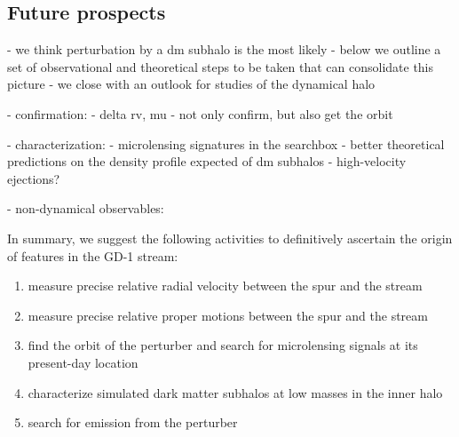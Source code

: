 \documentclass[twocolumn]{aastex62}
\newcommand{\acronym}[1]{{\small{#1}}}
\newcommand{\lcdm}{\acronym{$\Lambda$CDM}}
\begin{document}



\subsection{Future prospects}
\label{sec:future}
- we think perturbation by a dm subhalo is the most likely
- below we outline a set of observational and theoretical steps to be taken that can consolidate this picture
- we close with an outlook for studies of the dynamical halo

- confirmation:
- delta rv, mu
- not only confirm, but also get the orbit

- characterization:
- microlensing signatures in the searchbox
- better theoretical predictions on the density profile expected of dm subhalos
- high-velocity ejections?

- non-dynamical observables:

In summary, we suggest the following activities to definitively ascertain the origin of features in the GD-1 stream:
\begin{enumerate}
 \item measure precise relative radial velocity between the spur and the stream
 \item measure precise relative proper motions between the spur and the stream
 \item find the orbit of the perturber and search for microlensing signals at its present-day location
 \item characterize simulated dark matter subhalos at low masses in the inner halo
 \item search for emission from the perturber
\end{enumerate}
\end{document}
